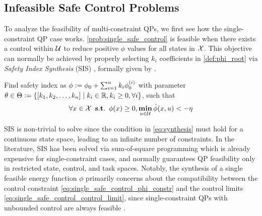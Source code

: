 \subsection{Infeasible Safe Control Problems}\label{sec:infeas_safe_control_problem}



To analyze the feasibility of multi-constraint QPs, we first see how the single-constraint QP case works.
\eqref{prob:single_safe_control} is feasible when there exists a control within $\mathcal{U}$ to reduce positive $\phi$ values for all states in $\mathcal{X}$.
This objective can normally be achieved by properly selecting $k_i$ coefficients in \eqref{def:phi_root} via \textit{Safety Index Synthesis} (SIS) \cite{zhao2023sos, chen2023sis}, formally given by .
\begin{problem}  \label{problem:synthesis}
    Find safety index as $\phi \vcentcolon= \phi_0 + \sum_{i=1}^{n}k_i \phi^{(i)}_0$ with parameter $\theta\in\Theta\vcentcolon=\{[k_1,k_2,\dots,k_{n}] \mid k_i\in\mathbb{R},k_i\geq 0,\forall i \}$, such that
    \begin{equation}\label{eq:synthesis}
        \forall x\in\mathcal{X} ~ \mathop{\mathbf{s.t.}} ~ \phi(x)\geq 0, \mathop{\underset{u\in\mathcal{U}}{\mathop{\mathbf{min}}}} \dot{\phi}(x,u) < -\eta
    \end{equation}
\end{problem}
SIS is non-trivial to solve since the condition in \eqref{eq:synthesis} must hold for a continuous state space, leading to an infinite number of constraints.
In the literature, SIS has been solved via sum-of-square programming \cite{zhao2023sos, chen2023sis} which is already expensive for single-constraint cases, and normally guarantees QP feasibility only in restricted state, control, and task spaces.
Notably, the synthesis of a single feasible energy function $\phi$ primarily concerns about the compatibility between the control constraint \eqref{eq:single_safe_control_phi_constr} and the control limits \eqref{eq:single_safe_control_control_limit}, since single-constraint QPs with unbounded control are always feasible \cite{liu2014control}.
